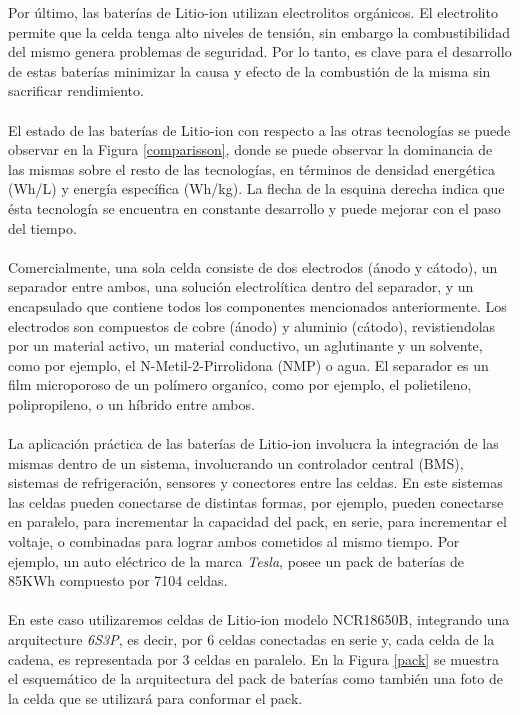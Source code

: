 \documentclass[10pt,a4paper]{article}
\begin{document}
\noindent Por último, las baterías de Litio-ion utilizan electrolitos orgánicos. El electrolito permite que la celda tenga alto niveles de tensión, sin embargo la combustibilidad del mismo genera problemas de seguridad. Por lo tanto, es clave para el desarrollo de estas baterías minimizar la causa y efecto de la combustión de la misma sin sacrificar rendimiento.\\
\\
\noindent El estado de las baterías de Litio-ion con respecto a las otras tecnologías se puede observar en la Figura \ref{comparisson}, donde se puede observar la dominancia de las mismas sobre el resto de las tecnologías, en términos de densidad energética (Wh/L) y energía específica (Wh/kg). La flecha de la esquina derecha indica que ésta tecnología se encuentra en constante desarrollo y puede mejorar con el paso del tiempo.\\
\\
\noindent Comercialmente, una sola celda consiste de dos electrodos (ánodo y cátodo), un separador entre ambos, una solución electrolítica dentro del separador, y un encapsulado que contiene todos los componentes mencionados anteriormente. Los electrodos son compuestos de cobre (ánodo) y aluminio (cátodo), revistiendolas por un material activo, un material conductivo, un aglutinante y un solvente, como por ejemplo, el N-Metil-2-Pirrolidona (NMP) o agua. El separador es un film microporoso de un polímero organíco, como por ejemplo, el polietileno, polipropileno, o un híbrido entre ambos.\\
\\
\noindent La aplicación práctica de las baterías de Litio-ion involucra la integración de las mismas dentro de un sistema, involucrando un controlador central (BMS), sistemas de refrigeración, sensores y conectores entre las celdas. En este sistemas las celdas pueden conectarse de distintas formas, por ejemplo, pueden conectarse en paralelo, para incrementar la capacidad del pack, en serie, para incrementar el voltaje, o combinadas para lograr ambos cometidos al mismo tiempo. Por ejemplo, un auto eléctrico de la marca \emph{Tesla}, posee un pack de baterías de 85KWh compuesto por 7104 celdas.\\
\\
\noindent En este caso utilizaremos celdas de Litio-ion modelo NCR18650B, integrando una arquitecture \emph{6S3P}, es decir, por 6 celdas conectadas en serie y, cada celda de la cadena, es representada por 3 celdas en paralelo. En la Figura \ref{pack} se muestra el esquemático de la arquitectura del pack de baterías como también una foto de la celda que se utilizará para conformar el pack. 
\end{document}
